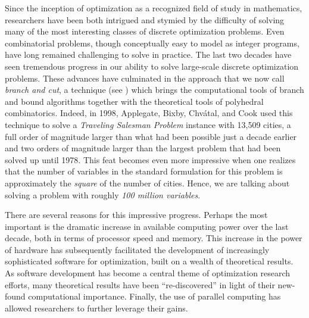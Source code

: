 Since the inception of optimization as a recognized field of study in
mathematics, researchers have been both intrigued and stymied by the
difficulty of solving many of the most interesting classes of discrete
optimization problems. Even combinatorial problems, though
conceptually easy to model as integer programs, have long remained
challenging to solve in practice. The last two decades have seen
tremendous progress in our ability to solve large-scale discrete
optimization problems. These advances have culminated in the approach
that we now call {\it branch and cut}, a technique (see \cite{GJ&R,
P&R, H&P}) which brings the computational tools of branch and bound
algorithms together with the theoretical tools of polyhedral
combinatorics. Indeed, in 1998, Applegate, Bixby, Chv\'atal, and Cook
used this technique to solve a {\em Traveling Salesman Problem}
instance with 13,509 cities, a full order of magnitude larger than
what had been possible just a decade earlier \cite{concorde} and two
orders of magnitude larger than the largest problem that had been
solved up until 1978. This feat becomes even more impressive when one
realizes that the number of variables in the standard formulation for
this problem is approximately the {\em square} of the number of
cities. Hence, we are talking about solving a problem with roughly
{\em 100 million variables}.

There are several reasons for this impressive progress. Perhaps the
most important is the dramatic increase in available computing power
over the last decade, both in terms of processor speed and memory.
This increase in the power of hardware has subsequently facilitated
the development of increasingly sophisticated software for
optimization, built on a wealth of theoretical results. As software
development has become a central theme of optimization research
efforts, many theoretical results have been ``re-discovered'' in light
of their new-found computational importance. Finally, the use of
parallel computing has allowed researchers to further leverage their
gains.

